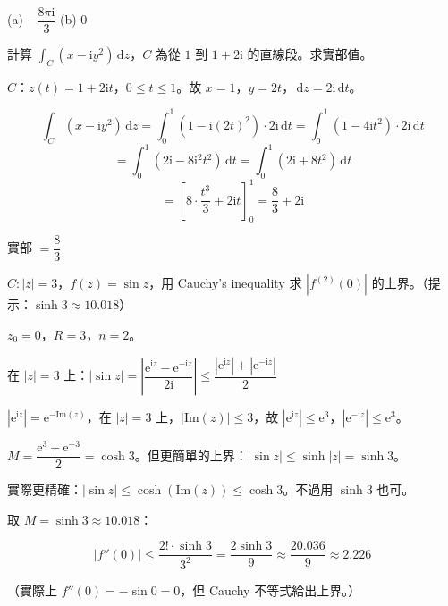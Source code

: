 \documentclass[12pt,a4paper]{article}
\newcommand{\dd}{\,\mathrm{d}}
\newcommand{\ii}{\mathrm{i}}
\newcommand{\ee}{\mathrm{e}}
\begin{document}
\begin{ansbox}
(a) $\boxed{-\dfrac{8\pi\ii}{3}}$ \qquad (b) $\boxed{0}$
\end{ansbox}

\begin{qbox}[第 3 題\,---\,複數線積分]
計算 $\displaystyle\int_C(x-\ii y^2)\dd{z}$，$C$ 為從 $1$ 到 $1+2\ii$ 的直線段。求實部值。
\end{qbox}

\begin{solbox}[解]
$C$：$z(t)=1+2\ii t$，$0\le t\le 1$。故 $x=1$，$y=2t$，$\dd{z}=2\ii\dd{t}$。

$$\int_C(x-\ii y^2)\dd{z}=\int_0^1(1-\ii(2t)^2)\cdot 2\ii\dd{t}=\int_0^1(1-4\ii t^2)\cdot 2\ii\dd{t}$$
$$=\int_0^1(2\ii-8\ii^2 t^2)\dd{t}=\int_0^1(2\ii+8t^2)\dd{t}$$
$$=\left[8\cdot\frac{t^3}{3}+2\ii t\right]_0^1=\frac{8}{3}+2\ii$$
\end{solbox}

\begin{ansbox}
實部 $=\boxed{\dfrac{8}{3}}$
\end{ansbox}

\begin{qbox}
$C:|z|=3$，$f(z)=\sin z$，用 Cauchy's inequality 求 $|f^{(2)}(0)|$ 的上界。（提示：$\sinh 3\approx 10.018$）
\end{qbox}

\begin{solbox}[解]
$z_0=0$，$R=3$，$n=2$。

在 $|z|=3$ 上：$|\sin z|=\left|\dfrac{\ee^{\ii z}-\ee^{-\ii z}}{2\ii}\right|\le\dfrac{|\ee^{\ii z}|+|\ee^{-\ii z}|}{2}$

$|\ee^{\ii z}|=\ee^{-\text{Im}(z)}$，在 $|z|=3$ 上，$|\text{Im}(z)|\le 3$，故 $|\ee^{\ii z}|\le\ee^3$，$|\ee^{-\ii z}|\le\ee^3$。

$M=\dfrac{\ee^3+\ee^{-3}}{2}=\cosh 3$。但更簡單的上界：$|\sin z|\le\sinh|z|=\sinh 3$。

實際更精確：$|\sin z|\le\cosh(\text{Im}(z))\le\cosh 3$。不過用 $\sinh 3$ 也可。

取 $M=\sinh 3\approx 10.018$：

$$|f''(0)|\le\frac{2!\cdot\sinh 3}{3^2}=\frac{2\sinh 3}{9}\approx\frac{20.036}{9}\approx 2.226$$

（實際上 $f''(0)=-\sin 0=0$，但 Cauchy 不等式給出上界。）
\end{solbox}
\end{document}
